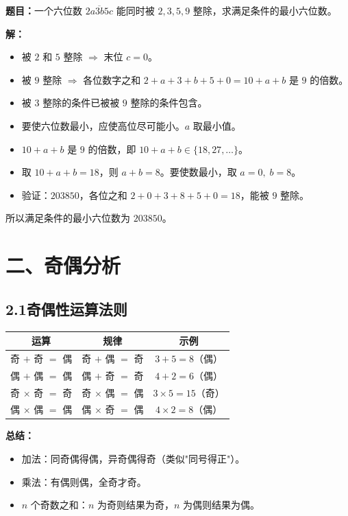 \documentclass[12pt, a4paper]{ctexart}
\begin{document}
\begin{examplebox}[【例3】尾数判断的综合应用]
\textbf{题目：}一个六位数 $\overline{2a3b5c}$ 能同时被 $2,3,5,9$ 整除，求满足条件的最小六位数。
\end{examplebox}

\textbf{解：}\;
\begin{itemize}[itemsep=2pt]
  \item 被 $2$ 和 $5$ 整除 $\Rightarrow$ 末位 $c=0$。
  \item 被 $9$ 整除 $\Rightarrow$ 各位数字之和 $2+a+3+b+5+0=10+a+b$ 是 $9$ 的倍数。
  \item 被 $3$ 整除的条件已被被 $9$ 整除的条件包含。
  \item 要使六位数最小，应使高位尽可能小。$a$ 取最小值。
  \item $10+a+b$ 是 $9$ 的倍数，即 $10+a+b\in\{18,27,\ldots\}$。
  \item 取 $10+a+b=18$，则 $a+b=8$。要使数最小，取 $a=0,\;b=8$。
  \item 验证：$203850$，各位之和 $2+0+3+8+5+0=18$，能被 $9$ 整除。\checkmark
\end{itemize}
所以满足条件的最小六位数为 $\boxed{203850}$。

\newpage
\section*{\textcolor{mainblue}{二、奇偶分析}}

\subsection*{2.1\quad 奇偶性运算法则}

\begin{knowledgebox}[奇偶性运算规律]
\begin{center}
\renewcommand{\arraystretch}{1.3}
\begin{tabular}{c|c|c}
\toprule
运算 & 规律 & 示例 \\
\midrule
奇 $+$ 奇 $=$ 偶 & 奇 $+$ 偶 $=$ 奇 & $3+5=8$（偶） \\
偶 $+$ 偶 $=$ 偶 & 偶 $+$ 奇 $=$ 奇 & $4+2=6$（偶） \\
\midrule
奇 $\times$ 奇 $=$ 奇 & 奇 $\times$ 偶 $=$ 偶 & $3\times 5=15$（奇） \\
偶 $\times$ 偶 $=$ 偶 & 偶 $\times$ 奇 $=$ 偶 & $4\times 2=8$（偶） \\
\bottomrule
\end{tabular}
\end{center}
\textbf{总结：}
\begin{itemize}[itemsep=1pt]
  \item 加法：同奇偶得偶，异奇偶得奇（类似"同号得正"）。
  \item 乘法：有偶则偶，全奇才奇。
  \item $n$ 个奇数之和：$n$ 为奇则结果为奇，$n$ 为偶则结果为偶。
\end{itemize}
\end{knowledgebox}
\end{document}
